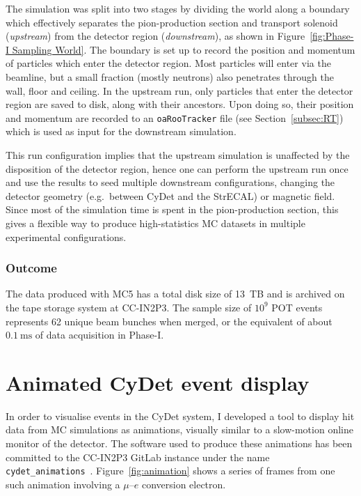 The simulation was split into two stages by dividing the world along a boundary
which effectively separates the pion-production section and transport solenoid
(\emph{upstream}) from the detector region (\emph{downstream}), as shown in
Figure~\ref{fig:Phase-I Sampling World}. The boundary is set up to record the
position and momentum of particles which enter the detector region. Most
particles will enter via the beamline, but a small fraction (mostly neutrons)
also penetrates through the wall, floor and ceiling. In the upstream run, only
particles that enter the detector region are saved to disk, along with their
ancestors. Upon doing so, their position and momentum are recorded to an
\texttt{oaRooTracker} file (see Section~\ref{subsec:RT}) which is used as input
for the downstream simulation.

This run configuration implies that the upstream simulation is unaffected by the
disposition of the detector region, hence one can perform the upstream run once
and use the results to seed multiple downstream configurations, changing the
detector geometry (e.g.\ between CyDet and the StrECAL) or magnetic field. Since
most of the simulation time is spent in the pion-production section, this gives
a flexible way to produce high-statistics MC datasets in multiple experimental
configurations.

\subsubsection{Outcome}
The data produced with MC5 has a total disk size of \SI{13}{TB} and is archived
on the tape storage system at CC-IN2P3. The sample size of $10^9$ POT events
represents 62 unique beam bunches when merged, or the equivalent of
about $\SI{0.1}{\ms}$ of data acquisition in Phase\nobreakdash-I.

\section{Animated CyDet event display}
In order to visualise events in the CyDet system, I developed a tool to display
hit data from MC simulations as animations, visually similar to a slow-motion
online monitor of the detector. The software used to produce these animations
has been committed to the CC-IN2P3 GitLab instance under the name
\texttt{cydet\_animations}~\cite{cydetanimations}.
Figure~\ref{fig:animation} shows a series of frames from one such animation
involving a $\mu$--$e$ conversion electron.

